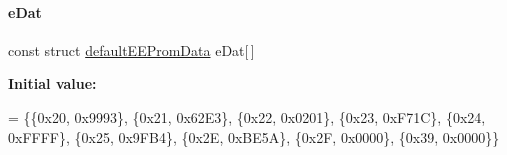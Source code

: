 \paragraph{\texorpdfstring{e\+Dat}{eDat}}
{\footnotesize\ttfamily const struct \mbox{\hyperlink{structdefault_e_e_prom_data}{default\+E\+E\+Prom\+Data}}  e\+Dat\mbox{[}$\,$\mbox{]}}

{\bfseries Initial value\+:}
\begin{DoxyCode}
=  \{\{0x20, 0x9993\}, \{0x21, 0x62E3\}, \{0x22, 0x0201\}, 
             \{0x23, 0xF71C\}, \{0x24, 0xFFFF\}, \{0x25, 0x9FB4\}, 
             \{0x2E, 0xBE5A\}, \{0x2F, 0x0000\}, \{0x39, 0x0000\}\}
\end{DoxyCode}
